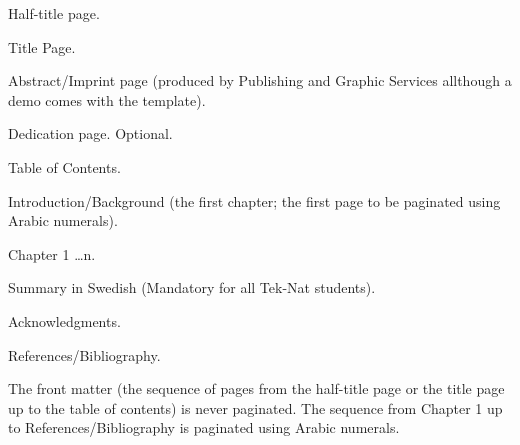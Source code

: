 \begin{bulletlist}
    \item Half-title page.
    \item Title Page.
    \item Abstract/Imprint page (produced by Publishing and Graphic Services all\-though a demo comes with the template).
    \item Dedication page. Optional.
    \item Table of Contents.
    \item Introduction/Background (the first chapter; the first page to be paginated using Arabic numerals).
    \item Chapter 1 \ldots n.
    \item Summary in Swedish (Mandatory for all Tek-Nat students).
    \item Acknowledgments.
    \item References/Bibliography.
\end{bulletlist}
\vspace{1\baselineskip}
\noindent The front matter (the sequence of pages from the half-title page or the title page up to the table of contents) is never paginated. The sequence from Chapter 1 up to References/Bibliography is paginated using Arabic numerals. 
